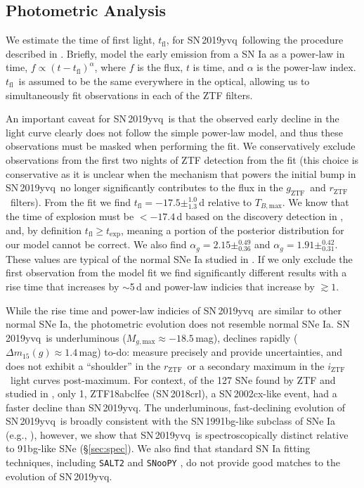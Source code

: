 \documentclass[twocolumn]{aastex63}
\newcommand{\todo}[1]{{\color{magenta} to-do: {#1}}}
\newcommand{\rztf}{$r_\mathrm{ZTF}$}
\newcommand{\gztf}{$g_\mathrm{ZTF}$}
\newcommand{\iztf}{$i_\mathrm{ZTF}$}
\newcommand{\tfl}{$t_\mathrm{fl}$}
\newcommand{\tbmax}{$T_{B,\mathrm{max}}$}
\newcommand{\sn}{SN\,2019yvq}
\begin{document}
\subsection{Photometric Analysis}\label{sec:phot}

We estimate the time of first light, \tfl, for \sn\ following the procedure
described in \citet{Miller20}. Briefly, \citet{Miller20} model the early
emission from a SN Ia as a power-law in time, $f \propto (t -
t_\mathrm{fl})^\alpha$, where $f$ is the flux, $t$ is time, and $\alpha$ is
the power-law index. \tfl\ is assumed to be the same everywhere in the
optical, allowing us to simultaneously fit observations in each of the ZTF
filters.

An important caveat for \sn\ is that the observed early decline in the light
curve clearly does not follow the simple power-law model, and thus these
observations must be masked when performing the fit. We conservatively
exclude observations from the first two nights of ZTF detection from the fit
(this choice is conservative as it is unclear when the mechanism that powers
the initial bump in \sn\ no longer significantly contributes to the flux in
the \gztf\ and \rztf\ filters). From the fit we find \tfl$ = -17.5
\pm^{1.0}_{1.3}$\,d relative to \tbmax. We know that the time of explosion
must be $< -17.4$\,d based on the discovery detection in \citealt{Itagaki19},
and, by definition $t_\mathrm{fl} \ge t_\mathrm{exp}$, meaning a portion of
the posterior distribution for our model cannot be correct. We also find
$\alpha_g = 2.15 \pm^{0.49}_{0.36}$ and $\alpha_g = 1.91 \pm^{0.42}_{0.31}$.
These values are typical of the normal SNe Ia studied in \citet{Miller20}. If
we only exclude the first observation from the model fit we find
significantly different results with a rise time that increases by $\sim$5\,d
and power-law indicies that increase by $\gtrsim 1$.

While the rise time and power-law indicies of \sn\ are similar to other
normal SNe Ia, the photometric evolution does not resemble normal SNe Ia.
\sn\ is underluminous ($M_{g,\mathrm{max}} \approx -18.5$\,mag), declines
rapidly ($\Delta m_{15}(g) \approx 1.4$\,mag) \todo{measure precisely and
provide uncertainties}, and does not exhibit a ``shoulder'' in the \rztf\ or a
secondary maximum in the \iztf\ light curves post-maximum. For context, of
the 127 SNe found by ZTF and studied in \citet{Yao19}, only 1, ZTF18abclfee
(SN\,2018crl), a SN\,2002cx-like event, had a faster decline than \sn. The
underluminous, fast-declining evolution of \sn\ is broadly consistent with
the SN\,1991bg-like subclass of SNe Ia (e.g., \citealt{Taubenberger17}),
however, we show that \sn\ is spectroscopically distinct relative to
91bg-like SNe (\S\ref{sec:spec}). We also find that standard SN Ia fitting
techniques, including \texttt{SALT2} \citep{Guy07} and \texttt{SNooPY}
\citep{Burns11}, do not provide good matches to the evolution of \sn.
\end{document}
